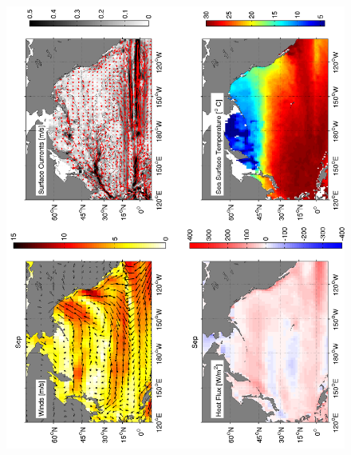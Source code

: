 \begin{figure}[hbt]
  \begin{center}
  \includegraphics[angle=270]{figs/WindOverview/SurfaceCurrents09}
    \caption{}
    \label{fig:}  
  \end{center}
\end{figure}

